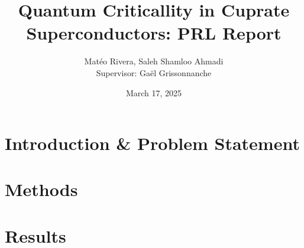 \documentclass[12pt]{article}
\title{Quantum Criticallity in Cuprate Superconductors: PRL Report}
\author{Matéo Rivera, Saleh Shamloo Ahmadi\\Supervisor: Gaël Grissonnanche}
\date{March 17, 2025}
\begin{document}
\maketitle
\section{Introduction \& Problem Statement}







\section{Methods}




\section{Results}



\end{document}

